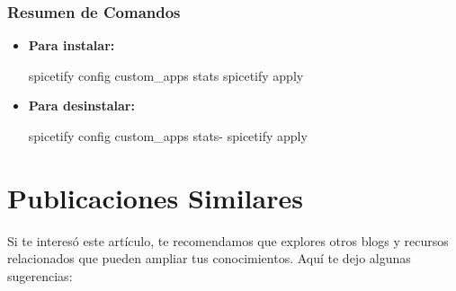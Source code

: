 \documentclass[
  jou,
  floatsintext,
  longtable,
  a4paper,
  nolmodern,
  notxfonts,
  notimes,
  12pt,
  colorlinks=true,linkcolor=blue,citecolor=blue,urlcolor=blue]{apa7}
\newenvironment{Shaded}{\begin{snugshade}}{\end{snugshade}}
\newcommand{\ExtensionTok}[1]{\textcolor[rgb]{0.00,0.23,0.31}{#1}}
\newcommand{\NormalTok}[1]{\textcolor[rgb]{0.00,0.23,0.31}{#1}}
\begin{document}
\subsubsection{Resumen de Comandos}\label{resumen-de-comandos}

\begin{itemize}
\item
  \textbf{Para instalar:}

\begin{Shaded}
\begin{Highlighting}[]
\ExtensionTok{spicetify}\NormalTok{ config custom\_apps stats}
\ExtensionTok{spicetify}\NormalTok{ apply}
\end{Highlighting}
\end{Shaded}
\item
  \textbf{Para desinstalar:}

\begin{Shaded}
\begin{Highlighting}[]
\ExtensionTok{spicetify}\NormalTok{ config custom\_apps stats{-}}
\ExtensionTok{spicetify}\NormalTok{ apply}
\end{Highlighting}
\end{Shaded}
\end{itemize}

\section{Publicaciones Similares}\label{publicaciones-similares}

Si te interesó este artículo, te recomendamos que explores otros blogs y
recursos relacionados que pueden ampliar tus conocimientos. Aquí te dejo
algunas sugerencias:
\end{document}
